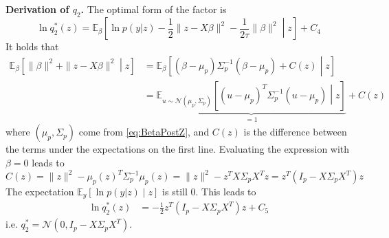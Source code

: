\documentclass[11pt]{article}
\newcommand\EE{\mathbb{E}}
\newcommand{\calN}{\mathcal{N}}
\begin{document}
\textbf{Derivation of \boldmath$q_2$.} The optimal form of the factor is
\begin{equation}
	\ln q_2^*(z) = \EE_{\beta}\left[
	\ln p(y|z) - \frac{1}{2}\|z-X\beta\|^2 - \frac{1}{2\tau} \|\beta\|^2
	\middle| z
	\right] + C_4
\end{equation}
It holds that
\[
\begin{aligned}
	\EE_\beta \left[
		\|\beta\|^2 + \|z-X\beta\|^2 \middle| z
	\right]
	&=
	\EE_\beta\left[
	(\beta - \mu_p)\Sigma_p^{-1}(\beta - \mu_p) + C(z)
	\middle| z
	\right] \\
	&= \underbrace{\EE_{u\sim \calN(\mu_p,\Sigma_p)}\left[
	(u - \mu_p)^T \Sigma_p^{-1}(u - \mu_p)
	\middle| z
	\right]}_{=1} + C(z)
\end{aligned}
\]
where $(\mu_p,\Sigma_p)$ come from \cref{eq:BetaPostZ}, and $C(z)$ is the difference between the terms under the expectations on the first line. Evaluating the expression with $\beta = 0$ leads to
\[
	C(z) = \|z\|^2 - \mu_p(z)^T \Sigma_p^{-1}\mu_p(z)
	= \|z\|^2 - z^T X\Sigma_p X^T z =
	z^T(I_p - X\Sigma_pX^T)z
\]
The expectation $\EE_y[\ln p(y|z) \mid z]$ is still $0$.
This leads to
\begin{equation}
\begin{aligned}
	\ln q_2^*(z) &=
	-\frac{1}{2} z^T (I_p - X\Sigma_p X^T)z + C_5
\end{aligned}
\end{equation}
i.e. $\boxed{q_2^* = \calN(0, I_p - X\Sigma_pX^T).}$
\end{document}
